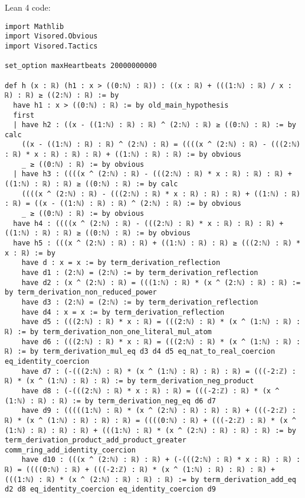 \documentclass{article}
\begin{document}
Lean 4 code:
\begin{tcolorbox}[colback=white!10, width=\linewidth]
\begin{lstlisting}[language=Lean4]
import Mathlib
import Visored.Obvious
import Visored.Tactics

set_option maxHeartbeats 20000000000

def h (x : ℝ) (h1 : x > ((0:ℕ) : ℝ)) : ((x : ℝ) + (((1:ℕ) : ℝ) / x : ℝ) : ℝ) ≥ ((2:ℕ) : ℝ) := by
  have h1 : x > ((0:ℕ) : ℝ) := by old_main_hypothesis
  first
  | have h2 : ((x - ((1:ℕ) : ℝ) : ℝ) ^ (2:ℕ) : ℝ) ≥ ((0:ℕ) : ℝ) := by calc
    ((x - ((1:ℕ) : ℝ) : ℝ) ^ (2:ℕ) : ℝ) = ((((x ^ (2:ℕ) : ℝ) - (((2:ℕ) : ℝ) * x : ℝ) : ℝ) : ℝ) + ((1:ℕ) : ℝ) : ℝ) := by obvious
    _ ≥ ((0:ℕ) : ℝ) := by obvious
  | have h3 : ((((x ^ (2:ℕ) : ℝ) - (((2:ℕ) : ℝ) * x : ℝ) : ℝ) : ℝ) + ((1:ℕ) : ℝ) : ℝ) ≥ ((0:ℕ) : ℝ) := by calc
    ((((x ^ (2:ℕ) : ℝ) - (((2:ℕ) : ℝ) * x : ℝ) : ℝ) : ℝ) + ((1:ℕ) : ℝ) : ℝ) = ((x - ((1:ℕ) : ℝ) : ℝ) ^ (2:ℕ) : ℝ) := by obvious
    _ ≥ ((0:ℕ) : ℝ) := by obvious
  have h4 : ((((x ^ (2:ℕ) : ℝ) - (((2:ℕ) : ℝ) * x : ℝ) : ℝ) : ℝ) + ((1:ℕ) : ℝ) : ℝ) ≥ ((0:ℕ) : ℝ) := by obvious
  have h5 : (((x ^ (2:ℕ) : ℝ) : ℝ) + ((1:ℕ) : ℝ) : ℝ) ≥ (((2:ℕ) : ℝ) * x : ℝ) := by
    have d : x = x := by term_derivation_reflection
    have d1 : (2:ℕ) = (2:ℕ) := by term_derivation_reflection
    have d2 : (x ^ (2:ℕ) : ℝ) = (((1:ℕ) : ℝ) * (x ^ (2:ℕ) : ℝ) : ℝ) := by term_derivation_non_reduced_power
    have d3 : (2:ℕ) = (2:ℕ) := by term_derivation_reflection
    have d4 : x = x := by term_derivation_reflection
    have d5 : (((2:ℕ) : ℝ) * x : ℝ) = (((2:ℕ) : ℝ) * (x ^ (1:ℕ) : ℝ) : ℝ) := by term_derivation_non_one_literal_mul_atom
    have d6 : (((2:ℕ) : ℝ) * x : ℝ) = (((2:ℕ) : ℝ) * (x ^ (1:ℕ) : ℝ) : ℝ) := by term_derivation_mul_eq d3 d4 d5 eq_nat_to_real_coercion eq_identity_coercion
    have d7 : (-(((2:ℕ) : ℝ) * (x ^ (1:ℕ) : ℝ) : ℝ) : ℝ) = (((-2:ℤ) : ℝ) * (x ^ (1:ℕ) : ℝ) : ℝ) := by term_derivation_neg_product
    have d8 : (-(((2:ℕ) : ℝ) * x : ℝ) : ℝ) = (((-2:ℤ) : ℝ) * (x ^ (1:ℕ) : ℝ) : ℝ) := by term_derivation_neg_eq d6 d7
    have d9 : (((((1:ℕ) : ℝ) * (x ^ (2:ℕ) : ℝ) : ℝ) : ℝ) + (((-2:ℤ) : ℝ) * (x ^ (1:ℕ) : ℝ) : ℝ) : ℝ) = ((((0:ℕ) : ℝ) + (((-2:ℤ) : ℝ) * (x ^ (1:ℕ) : ℝ) : ℝ) : ℝ) + (((1:ℕ) : ℝ) * (x ^ (2:ℕ) : ℝ) : ℝ) : ℝ) := by term_derivation_product_add_product_greater comm_ring_add_identity_coercion
    have d10 : (((x ^ (2:ℕ) : ℝ) : ℝ) + (-(((2:ℕ) : ℝ) * x : ℝ) : ℝ) : ℝ) = ((((0:ℕ) : ℝ) + (((-2:ℤ) : ℝ) * (x ^ (1:ℕ) : ℝ) : ℝ) : ℝ) + (((1:ℕ) : ℝ) * (x ^ (2:ℕ) : ℝ) : ℝ) : ℝ) := by term_derivation_add_eq d2 d8 eq_identity_coercion eq_identity_coercion d9

\end{lstlisting}
\end{tcolorbox}
\end{document}
